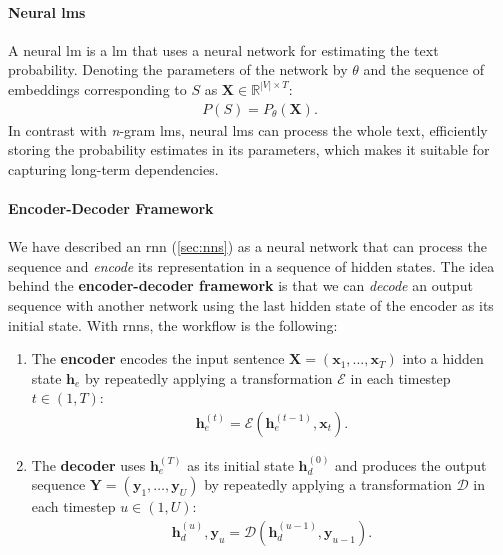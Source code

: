 \paragraph{Neural \acp{lm}} A neural \ac{lm} is a \acl{lm} that uses a neural network for estimating the text probability. Denoting the parameters of the network by $\theta$ and the sequence of embeddings corresponding to $S$ as $\mathbf{X} \in \mathbb{R}^{|V|\times T}$:
\begin{align}
    P(S) = P_\theta(\mathbf{X}).
\end{align}
In contrast with \emph{n}-gram \acp{lm}, neural \acp{lm} can process the whole text, efficiently storing the probability estimates in its parameters, which makes it suitable for capturing long-term dependencies.


\paragraph{Encoder-Decoder Framework}
We have described an \ac{rnn} (\autoref{sec:nns}) as a neural network that can process the sequence and \emph{encode} its representation in a sequence of hidden states. The idea behind the \textbf{encoder-decoder framework} \cite{sutskever2014sequence,cho2014learning} is that we can \emph{decode} an output sequence with another network using the last hidden state of the encoder as its initial state. With \acp{rnn}, the workflow is the following:

\begin{enumerate}
    \item The \textbf{encoder} encodes the input sentence $\mathbf{X}= (\mathbf{x}_1, \ldots, \mathbf{x}_T)$ into a hidden state $\mathbf{h}_e$ by repeatedly applying a transformation $\mathcal{E}$ in each timestep $t\in(1,T)$:
          \begin{align}
              \mathbf{h}_e^{(t)} = \mathcal{E}(\mathbf{h}_e^{(t-1)}, \mathbf{x}_t).
          \end{align}
    \item The \textbf{decoder} uses $\mathbf{h}_e^{(T)}$ as its initial state $\mathbf{h}_d^{(0)}$ and produces the output sequence  $\mathbf{Y} = (\mathbf{y}_1, \ldots, \mathbf{y}_U)$ by repeatedly applying a transformation $\mathcal{D}$ in each timestep $u\in(1,U)$:
          \begin{align}
              \mathbf{h}_d^{(u)}, \mathbf{y}_u = \mathcal{D}(\mathbf{h}_d^{(u-1)}, \mathbf{y}_{u-1}).
          \end{align}
\end{enumerate}

